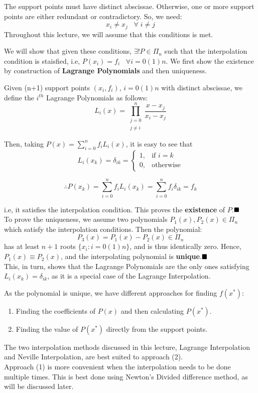 \begin{rmk}
	The support points must have distinct abscissae. Otherwise, one or more support points are either redundant or contradictory. So, we need:
	$$x_i \neq x_j \;\;\;\forall\;i\neq j$$
	Throughout this lecture, we will assume that this conditions is met.
\end{rmk}

We will show that given these conditions, $\exists! P \in \Pi_n$ such that the interpolation condition is staisfied, i.e, $P(x_i) = f_i\;\;\;\forall i=0(1)n$. We first show the existence by construction of \textbf{Lagrange Polynomials} and then uniqueness.\\

\begin{defn}
	Given (n+1) support points $(x_i,f_i)$, $i = 0(1)n$ with distinct abscissae, we define the $i^{th}$ Lagrange Polynomials as follows:
	$$L_i(x) = \prod^n_{\substack{ j = 0\\j \neq i}} \frac{x - x_j}{x_i - x_j}$$
\end{defn}


Then, taking $P(x) =  \sum_{i=0}^{n} f_i L_i(x)$, it is easy to see that
$$L_i(x_k) = \delta_{ik} =
	\begin{cases}
		1, & \text{if }i=k    \\
		0, & \text{otherwise}
	\end{cases}
$$

$$\therefore P(x_k) = \sum_{i=0}^{n} f_i L_i(x_k) =
	\sum_{i=0}^{n} f_i \delta_{ik} = f_k$$

i.e, it satisfies the interpolation condition.
This proves the \textbf{existence} of $P$.$\hfill \blacksquare$\\[.2 cm]
To prove the uniqueness, we assume two polynomials $P_1(x),P_2(x) \in \Pi_n$ which satisfy the interpolation conditions. Then the polynomial:
$$P_3(x) = P_1(x)-P_2(x) \in \Pi_n$$ has at least $n+1$ roots $\{x_i: i = 0(1)n\}$, and is thus identically zero. Hence, $P_1(x) \equiv P_2(x)$, and the interpolating polynomial is \textbf{unique}.$ \hfill\blacksquare $\\[0.2 cm]
This, in turn, shows that the Lagrange Polynomials are the only ones satisfying $L_i(x_k) = \delta_{ik}$, as it is a special case of the Lagrange Interpolation.

\begin{rmk}
	As the polynomial is unique, we have different approaches for finding $f(x^*)$:
	\begin{enumerate}
		\item Finding the coefficients of $P(x)$ and then calculating $P(x^*)$.
		\item Finding the value of $P(x^*)$ directly from the support points.
	\end{enumerate}
	The two interpolation methods discussed in this lecture, Lagrange Interpolation and Neville Interpolation, are best suited to approach (2).\\
	Approach (1) is more convenient when the interpolation needs to be done multiple times. This is best done using Newton's Divided difference method, as will be discussed later.
\end{rmk}

